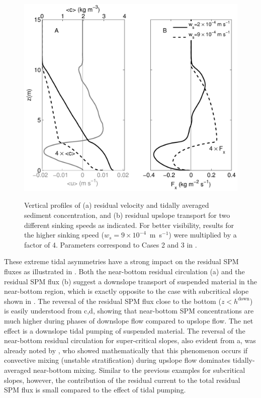 \begin{figure}[h]
  \noindent\includegraphics[width=29pc,angle=0]{bilder/Z226profile.pdf}\\
  \caption{Vertical profiles of (a) residual velocity and tidally
    averaged sediment concentration, and (b) residual upslope
    transport for two different sinking speeds as indicated.  For
    better visibility, results for the higher sinking speed ($w_s=9
    \times 10^{-4}$~m~s$^{-1}$) were multiplied by a factor of
    4. Parameters correspond to Cases 2 and 3 in
    .}\label{profsupercrit}
\end{figure}
These extreme tidal asymmetries have a strong impact on the residual
SPM fluxes as illustrated in . Both the near-bottom
residual circulation (a) and the residual SPM flux
(b) suggest a downslope transport of suspended
material in the near-bottom region, which is exactly opposite to the
case with subcritical slope shown in . The reversal of
the residual SPM flux close to the bottom ($z<h^\text{down}$) is
easily understood from c,d, showing that
near-bottom SPM concentrations are much higher during phases of
downslope flow compared to upslope flow. The net effect is a downslope
tidal pumping of suspended material.  The reversal of the near-bottom
residual circulation for super-critical slopes, also evident from
a, was already noted by \cite{UmlaufBurchard2011a},
who showed mathematically that this phenomenon occurs if convective
mixing (unstable stratification) during upslope flow dominates
tidally-averaged near-bottom mixing. Similar to the previous examples
for subcritical slopes, however, the contribution of the residual
current to the total residual SPM flux is small compared to the effect
of tidal pumping.


